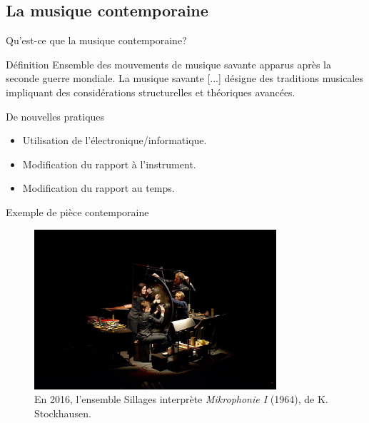 \documentclass[pdf]{beamer}
\begin{document}
\subsection{La musique contemporaine}
\begin{frame}{Qu'est-ce que la musique contemporaine?}

\begin{block}{Définition}
Ensemble des mouvements de musique savante apparus après la seconde guerre mondiale. La musique savante [...] désigne des traditions musicales impliquant des considérations structurelles et théoriques avancées.
\end{block}

\begin{block}{De nouvelles pratiques}
\begin{itemize}[label={$\square$}]
	\item Utilisation de l'électronique/informatique.
	\item Modification du rapport à l'instrument.
	\item Modification du rapport au temps.
\end{itemize}
\end{block}		

\end{frame}

\begin{frame}{Exemple de pièce contemporaine}

\begin{figure}
	\centering
	\includegraphics[keepaspectratio=true, width=0.8\textwidth]{./medias/mikrophonie-stockhausen.jpg}
	\caption{En 2016, l'ensemble Sillages interprète \textit{Mikrophonie I} (1964), de K. Stockhausen. }	
\end{figure}

\end{frame}
\end{document}
